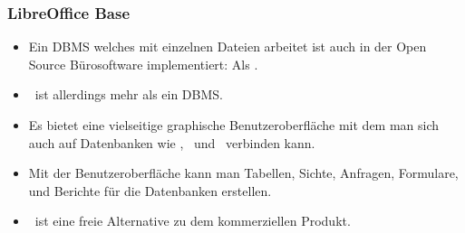 \documentclass[aspectratio=169,mathserif,notheorems]{beamer}%
\begin{document}
%
\begin{frame}[t]%
\frametitle{LibreOffice Base}%
\begin{itemize}%
\item Ein DBMS welches mit einzelnen Dateien arbeitet ist auch in der Open Source Bürosoftware \libreoffice\cite{DF2024LTDF,GL2012LTSOOSSCBAFACSOL,S2022L7PFEUU} implementiert: Als \libreofficeBase\cite{FNFHWSKLSSGLFRSRPLJG2022BG7R1BOL7C,S2022L7PFEUU}.%
\item<2-> \libreofficeBase\ ist allerdings mehr als ein DBMS.%
\item<3-> Es bietet eine vielseitige graphische Benutzeroberfläche mit dem man sich auch auf Datenbanken wie \mysql, \mariadb\ und \postgresql\ verbinden kann.%
\item<4-> Mit der Benutzeroberfläche kann man Tabellen, Sichte, Anfragen, Formulare, und Berichte für die Datenbanken erstellen.%
\item<5-> \libreofficeBase\ ist eine freie Alternative zu dem kommerziellen Produkt\microsoftAccess\cite{SSI2023MA2BTA,B2020HOMA2,UC2021AFD}.%
\end{itemize}%
%
%
\end{frame}%
%
\end{document}
